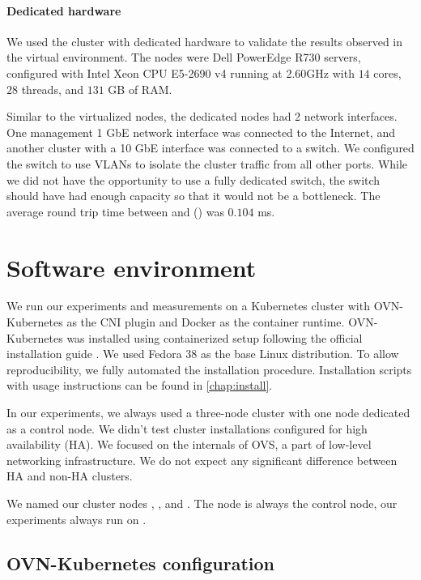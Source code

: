 \paragraph{Dedicated hardware}

We used the cluster with dedicated hardware to validate the results observed in the virtual environment. The nodes were Dell PowerEdge R730 servers, configured with Intel\textsuperscript{\textregistered} Xeon\textsuperscript{\textregistered} CPU E5-2690 v4 running at 2.60GHz with $14$ cores, $28$ threads, and $131$ GB of RAM.

Similar to the virtualized nodes, the dedicated nodes had 2 network interfaces. One management 1 GbE network interface was connected to the Internet, and another cluster with a 10 GbE interface was connected to a switch. We configured the switch to use VLANs to isolate the cluster traffic from all other ports. While we did not have the opportunity to use a fully dedicated switch, the switch should have had enough capacity so that it would not be a bottleneck. The average round trip time between  and  () was $0.104$ ms.

\section{Software environment}
\label{sec:sw-env}

We run our experiments and measurements on a Kubernetes cluster with OVN-Kubernetes as the CNI plugin and Docker as the container runtime. OVN-Kubernetes was installed using containerized setup following the official installation guide \cite{OVNInstallGuide}. We used Fedora 38 as the base Linux distribution. To allow reproducibility, we fully automated the installation procedure. Installation scripts with usage instructions can be found in \cref{chap:install}.

In our experiments, we always used a three-node cluster with one node dedicated as a control node. We didn't test cluster installations configured for high availability (HA). We focused on the internals of OVS, a part of low-level networking infrastructure. We do not expect any significant difference between HA and non-HA clusters.

We named our cluster nodes , , and . The node  is always the control node, our experiments always run on .

\subsection{OVN-Kubernetes configuration}
\label{subsec:ovnkube-limits}

